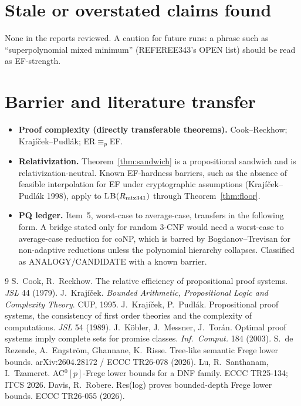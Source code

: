 \documentclass[11pt]{article}
\theoremstyle{remark}
\newcommand{\Rmix}{R_{\mathrm{mix341}}}
\begin{document}
\section*{Stale or overstated claims found}
None in the reports reviewed. A caution for future runs: a phrase such as ``superpolynomial mixed
minimum'' (REFEREE343's OPEN list) should be read as EF-strength.

\section*{Barrier and literature transfer}
\begin{itemize}
\item \textbf{Proof complexity (directly transferable theorems).} Cook--Reckhow; Krajíček--Pudlák;
ER$\equiv_p$EF.
\item \textbf{Relativization.} Theorem~\ref{thm:sandwich} is a propositional sandwich and is
relativization-neutral. Known EF-hardness barriers, such as the absence of feasible interpolation
for EF under cryptographic assumptions (Krajíček--Pudlák 1998), apply to $\textsc{LB}(\Rmix)$
through Theorem~\ref{thm:floor}.
\item \textbf{PQ ledger.} Item~5, worst-case to average-case, transfers in the following form. A
bridge stated only for random 3-CNF would need a worst-case to average-case reduction for coNP,
which is barred by Bogdanov--Trevisan for non-adaptive reductions unless the polynomial
hierarchy collapses. Classified as ANALOGY/CANDIDATE with a known barrier.
\end{itemize}

\begin{thebibliography}{9}
 S.~Cook, R.~Reckhow. The relative efficiency of propositional proof systems. \emph{JSL} 44 (1979).
 J.~Krajíček. \emph{Bounded Arithmetic, Propositional Logic and Complexity Theory}. CUP, 1995.
 J.~Krajíček, P.~Pudlák. Propositional proof systems, the consistency of first order theories and the complexity of computations. \emph{JSL} 54 (1989).
 J.~Köbler, J.~Messner, J.~Torán. Optimal proof systems imply complete sets for promise classes. \emph{Inf.\ Comput.} 184 (2003).
 S.~de Rezende, A.~Engström, Ghannane, K.~Risse. Tree-like semantic Frege lower bounds. arXiv:2604.28172 / ECCC TR26-078 (2026).
 Lu, R.~Santhanam, I.~Tzameret. AC$^0[p]$-Frege lower bounds for a DNF family. ECCC TR25-134; ITCS 2026.
 Davis, R.~Robere. Res(log) proves bounded-depth Frege lower bounds. ECCC TR26-055 (2026).
\end{thebibliography}
\end{document}

